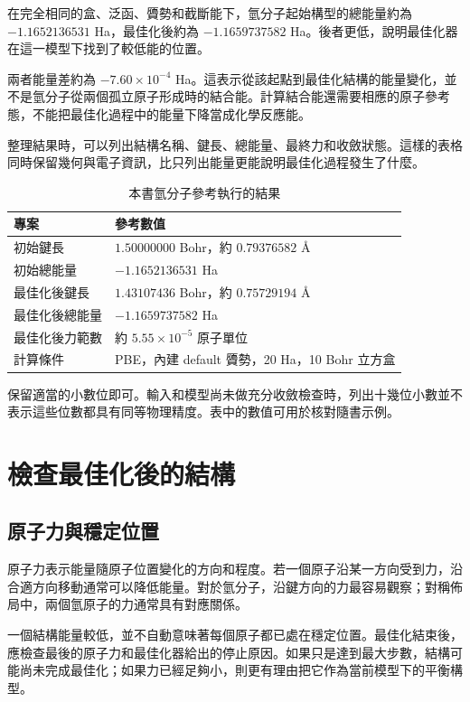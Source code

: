 在完全相同的盒、泛函、贗勢和截斷能下，氫分子起始構型的總能量約為 $-1.1652136531$ Ha，最佳化後約為 $-1.1659737582$ Ha。後者更低，說明最佳化器在這一模型下找到了較低能的位置。

兩者能量差約為 $-7.60\times10^{-4}$ Ha。這表示從該起點到最佳化結構的能量變化，並不是氫分子從兩個孤立原子形成時的結合能。計算結合能還需要相應的原子參考態，不能把最佳化過程中的能量下降當成化學反應能。

整理結果時，可以列出結構名稱、鍵長、總能量、最終力和收斂狀態。這樣的表格同時保留幾何與電子資訊，比只列出能量更能說明最佳化過程發生了什麼。

\begin{table}[htbp]
\centering
\caption{本書氫分子參考執行的結果}
\begin{tabularx}{\linewidth}{lX}
\toprule
專案 & 參考數值\\
\midrule
初始鍵長 & $1.50000000$ Bohr，約 $0.79376582$ Å\\
初始總能量 & $-1.1652136531$ Ha\\
最佳化後鍵長 & $1.43107436$ Bohr，約 $0.75729194$ Å\\
最佳化後總能量 & $-1.1659737582$ Ha\\
最佳化後力範數 & 約 $5.55\times10^{-5}$ 原子單位\\
計算條件 & PBE，內建 default 贗勢，20 Ha，10 Bohr 立方盒\\
\bottomrule
\end{tabularx}
\end{table}

保留適當的小數位即可。輸入和模型尚未做充分收斂檢查時，列出十幾位小數並不表示這些位數都具有同等物理精度。表中的數值可用於核對隨書示例。

\section{檢查最佳化後的結構}

\subsection{原子力與穩定位置}

原子力表示能量隨原子位置變化的方向和程度。若一個原子沿某一方向受到力，沿合適方向移動通常可以降低能量。對於氫分子，沿鍵方向的力最容易觀察；對稱佈局中，兩個氫原子的力通常具有對應關係。

一個結構能量較低，並不自動意味著每個原子都已處在穩定位置。最佳化結束後，應檢查最後的原子力和最佳化器給出的停止原因。如果只是達到最大步數，結構可能尚未完成最佳化；如果力已經足夠小，則更有理由把它作為當前模型下的平衡構型。

